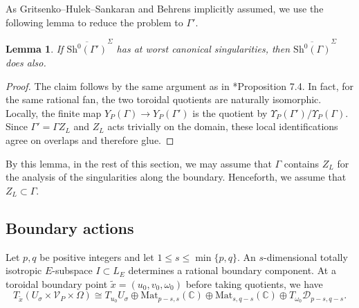 \documentclass[11pt]{amsart}
\theoremstyle{plain}
\newtheorem{lem}[thm]{Lemma}
\theoremstyle{definition}
\numberwithin{equation}{section}
\newcommand{\Mat}{\mathrm{Mat}}
\begin{document}
As Gritsenko--Hulek--Sankaran \cite{Gritsenko2007kodaira} and Behrens  \cite{behrens2012singularities} implicitly assumed, we use the following lemma to reduce the problem to $\Gamma'$. 
\begin{lem}
\label{lem:irregular singularity to non-irregular}
    If $\overline{\mathrm{Sh}^0(\Gamma')}^\Sigma$ has at worst canonical singularities, then $\overline{\mathrm{Sh}^0(\Gamma)}^\Sigma$ does also.
\end{lem}
\begin{proof}
        The claim follows by the same argument as in \cite{ma2025irregular}*{Proposition 7.4}.
        In fact, for the same rational fan, the two toroidal
quotients are naturally isomorphic. Locally, the finite map
$Y_P(\Gamma)\to Y_P(\Gamma')$ is the quotient by
$\Upsilon_P(\Gamma')/\Upsilon_P(\Gamma)$.
Since $\Gamma'=\Gamma Z_L$ and $Z_L$ acts trivially on the
domain, these local identifications agree
on overlaps and therefore glue.
\end{proof}

By this lemma, in the rest of this section, we may assume that $\Gamma$ contains $Z_L$ for the analysis of the singularities along the boundary.
Henceforth, we assume that $Z_L\subset\Gamma$.

\subsection{Boundary actions}
Let $p,q$ be positive integers and let
$1\leq s\leq\min\{p,q\}$. An $s$-dimensional totally isotropic
$E$-subspace $I\subset L_E$ determines a rational boundary component.
At a toroidal boundary point $\widetilde x=(u_0,v_0,\omega_0)$ before taking quotients, we have
\[
T_{\widetilde x}(U_\sigma\times\mathcal V_P\times\Omega)
\cong T_{u_0}U_\sigma
\oplus\Mat_{p-s,s}(\mathbb C)
\oplus\Mat_{s,q-s}(\mathbb C)
\oplus T_{\omega_0}\mathcal D_{p-s,q-s}.
\]
\end{document}
